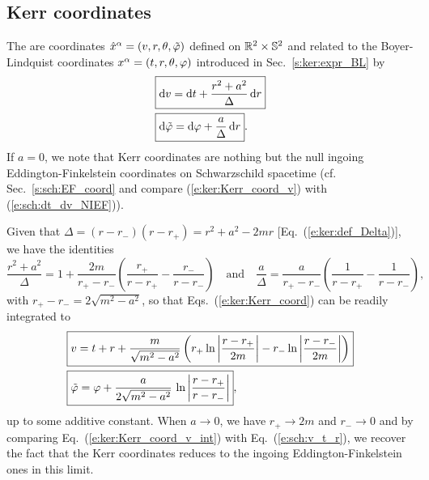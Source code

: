 \subsection{Kerr coordinates} \label{s:ker:Kerr_coord}

The  are coordinates
$\hat{x}^\alpha = (v,r,\theta,{\tilde\varphi})$ defined on $\mathbb{R}^2\times\mathbb{S}^2$ and related to the Boyer-Lindquist coordinates
$x^\alpha = (t,r,\theta,\varphi)$ introduced in Sec.~\ref{s:ker:expr_BL} by
\begin{subequations}
\label{e:ker:Kerr_coord}
\begin{align}
& \fbox{$\displaystyle \mathrm{d} v = \mathrm{d} t + \frac{r^2+a^2}{\Delta} \, \mathrm{d} r$} \label{e:ker:Kerr_coord_v}\\
& \fbox{$\displaystyle \mathrm{d} {\tilde\varphi} = \mathrm{d} \varphi + \frac{a}{\Delta}\, \mathrm{d} r$} . \label{e:ker:Kerr_coord_tph}
\end{align}
\end{subequations}
If $a=0$, we note that Kerr coordinates are nothing but the null
ingoing Eddington-Finkelstein
coordinates on Schwarzschild spacetime (cf. Sec.~\ref{s:sch:EF_coord} and compare
(\ref{e:ker:Kerr_coord_v}) with (\ref{e:sch:dt_dv_NIEF})).

Given that $\Delta = (r-r_-)(r-r_+) = r^2+a^2 - 2mr$ [Eq.~(\ref{e:ker:def_Delta})], we have
the identities
\[
    \frac{r^2+a^2}{\Delta} = 1 + \frac{2m}{r_+-r_-} \left( \frac{r_+}{r-r_+}
        - \frac{r_-}{r-r_-} \right) \quad\mbox{and}\quad
     \frac{a}{\Delta} = \frac{a}{r_+-r_-} \left( \frac{1}{r-r_+}
        - \frac{1}{r-r_-} \right) ,
\]
with $r_+-r_- = 2\sqrt{m^2-a^2}$,
so that Eqs.~(\ref{e:ker:Kerr_coord}) can be readily integrated to
\begin{subequations}
\label{e:ker:Kerr_coord_int}
\begin{align}
& \fbox{$\displaystyle v = t + r + \frac{m}{\sqrt{m^2-a^2}} \left(
    r_+ \ln\left| \frac{r-r_+}{2m} \right|
    - r_- \ln\left| \frac{r-r_-}{2m} \right| \right) $}\label{e:ker:Kerr_coord_v_int}\\
& \fbox{$\displaystyle  {\tilde\varphi} = \varphi + \frac{a}{2\sqrt{m^2-a^2}}\, \ln \left|
    \frac{r-r_+}{r-r_-} \right| $} , \label{e:ker:Kerr_coord_tph_int}
\end{align}
\end{subequations}
up to some additive constant.
When $a\rightarrow 0$, we have $r_+\rightarrow 2m$ and $r_-\rightarrow 0$
and by comparing Eq.~(\ref{e:ker:Kerr_coord_v_int}) with Eq.~(\ref{e:sch:v_t_r}), we recover the fact
that the Kerr coordinates reduces to the ingoing Eddington-Finkelstein
ones in this limit.

